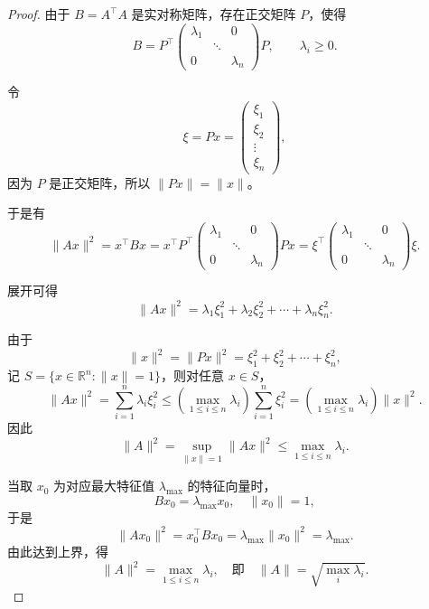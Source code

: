 \begin{proof}
由于 $B=A^\top A$ 是实对称矩阵，存在正交矩阵 $P$，使得
\[
B = P^\top 
\begin{pmatrix}
\lambda_1 & & 0\\
& \ddots & \\
0 & & \lambda_n
\end{pmatrix}
P,
\qquad
\lambda_i \ge 0.
\]

令
\[
\xi = P x =
\begin{pmatrix}
\xi_1 \\ \xi_2 \\ \vdots \\ \xi_n
\end{pmatrix},
\]
因为 $P$ 是正交矩阵，所以 $\|P x\| = \|x\|$。

于是有
\[
\|A x\|^2 = x^\top B x 
= x^\top P^\top 
\begin{pmatrix}
\lambda_1 & & 0\\
& \ddots & \\
0 & & \lambda_n
\end{pmatrix}
P x
= \xi^\top
\begin{pmatrix}
\lambda_1 & & 0\\
& \ddots & \\
0 & & \lambda_n
\end{pmatrix}
\xi.
\]

展开可得
\[
\|A x\|^2 
= \lambda_1 \xi_1^2 + \lambda_2 \xi_2^2 + \cdots + \lambda_n \xi_n^2.
\]

由于
\[
\|x\|^2 = \|P x\|^2 = \xi_1^2 + \xi_2^2 + \cdots + \xi_n^2,
\]
记 $S = \{x\in\mathbb{R}^n : \|x\|=1\}$，则对任意 $x\in S$，
\[
\|A x\|^2 = \sum_{i=1}^n \lambda_i \xi_i^2
\le \left( \max_{1\le i\le n}\lambda_i \right)
      \sum_{i=1}^n \xi_i^2
= \left( \max_{1\le i\le n}\lambda_i \right) \|x\|^2.
\]
因此
\[
\|A\|^2 = \sup_{\|x\|=1}\|A x\|^2
\le \max_{1\le i\le n}\lambda_i.
\]

当取 $x_0$ 为对应最大特征值 $\lambda_{\max}$ 的特征向量时，
\[
B x_0 = \lambda_{\max} x_0, \quad \|x_0\|=1,
\]
于是
\[
\|A x_0\|^2 = x_0^\top B x_0 = \lambda_{\max}\|x_0\|^2 = \lambda_{\max}.
\]
由此达到上界，得
\[
\boxed{\|A\|^2 = \max_{1\le i\le n}\lambda_i}, \quad 即\quad
\boxed{\|A\| = \sqrt{\max_i \lambda_i}}.
\]
\end{proof}

